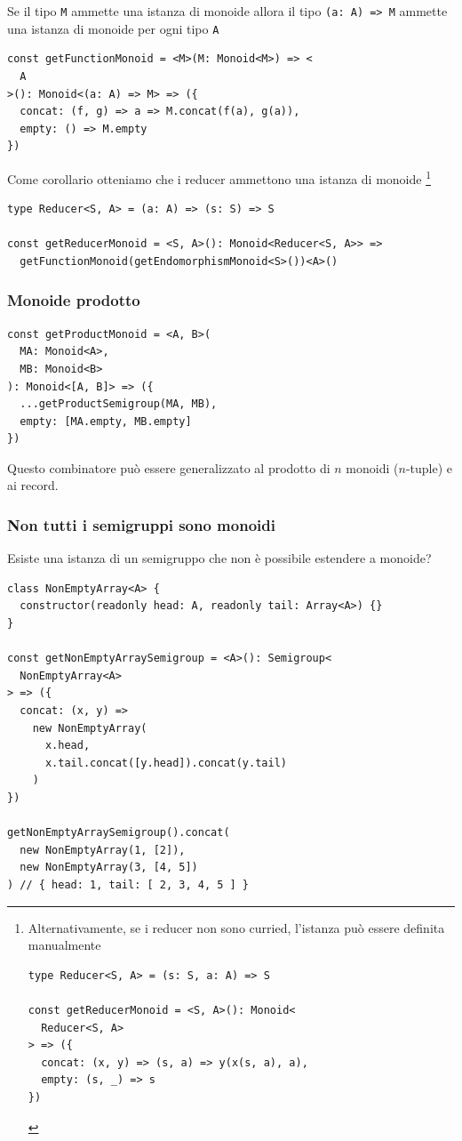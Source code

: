 \documentclass[12pt]{article}
\begin{document}
Se il tipo \texttt{M} ammette una istanza di monoide allora il tipo \texttt{(a: A) => M} ammette una istanza di monoide per ogni tipo \texttt{A}

\begin{verbatim}
const getFunctionMonoid = <M>(M: Monoid<M>) => <
  A
>(): Monoid<(a: A) => M> => ({
  concat: (f, g) => a => M.concat(f(a), g(a)),
  empty: () => M.empty
})
\end{verbatim}

Come corollario otteniamo che i reducer ammettono una istanza di monoide
\footnote{Alternativamente, se i reducer non sono curried, l'istanza può essere definita manualmente

\begin{verbatim}
type Reducer<S, A> = (s: S, a: A) => S

const getReducerMonoid = <S, A>(): Monoid<
  Reducer<S, A>
> => ({
  concat: (x, y) => (s, a) => y(x(s, a), a),
  empty: (s, _) => s
})
\end{verbatim}

}

\begin{verbatim}
type Reducer<S, A> = (a: A) => (s: S) => S

const getReducerMonoid = <S, A>(): Monoid<Reducer<S, A>> =>
  getFunctionMonoid(getEndomorphismMonoid<S>())<A>()
\end{verbatim}

\subsubsection{Monoide prodotto}

\begin{verbatim}
const getProductMonoid = <A, B>(
  MA: Monoid<A>,
  MB: Monoid<B>
): Monoid<[A, B]> => ({
  ...getProductSemigroup(MA, MB),
  empty: [MA.empty, MB.empty]
})
\end{verbatim}

Questo combinatore può essere generalizzato al prodotto di $n$ monoidi ($n$-tuple) e ai record.

\subsubsection{Non tutti i semigruppi sono monoidi}

Esiste una istanza di un semigruppo che non è possibile estendere a monoide?

\begin{verbatim}
class NonEmptyArray<A> {
  constructor(readonly head: A, readonly tail: Array<A>) {}
}

const getNonEmptyArraySemigroup = <A>(): Semigroup<
  NonEmptyArray<A>
> => ({
  concat: (x, y) =>
    new NonEmptyArray(
      x.head,
      x.tail.concat([y.head]).concat(y.tail)
    )
})

getNonEmptyArraySemigroup().concat(
  new NonEmptyArray(1, [2]),
  new NonEmptyArray(3, [4, 5])
) // { head: 1, tail: [ 2, 3, 4, 5 ] }
\end{verbatim}
\end{document}
